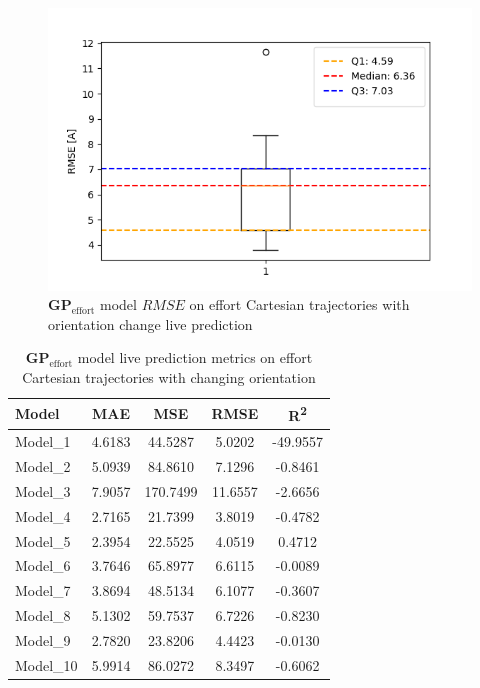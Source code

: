     \begin{figure}[H]
    \centering
    \includegraphics[width=1\columnwidth]{Images/05_results/effort_boxplot_live_OC_RMSE.png}
    \caption[\(\boldsymbol{GP}_{\text{effort}}\) model \(RMSE\) on effort Cartesian trajectories with orientation change live prediction]{\(\boldsymbol{GP}_{\text{effort}}\) model \(RMSE\) on effort Cartesian trajectories with orientation change live prediction}
    \label{fig:effort_oc_RMSE_live}
    \end{figure}

    \begin{table}[H]
    \centering
    \begin{tabular}{lcccc}
    \toprule
    \textbf{Model} & \textbf{MAE} & \textbf{MSE} & \textbf{RMSE} & \textbf{R\textsuperscript{2}} \\
    \midrule
    Model\_1 & 4.6183 & 44.5287 & 5.0202 & -49.9557 \\
    Model\_2 & 5.0939 & 84.8610 & 7.1296 & -0.8461 \\
    Model\_3 & 7.9057 & 170.7499 & 11.6557 & -2.6656 \\
    Model\_4 & 2.7165 & 21.7399 & 3.8019 & -0.4782 \\
    Model\_5 & 2.3954 & 22.5525 & 4.0519 & 0.4712 \\
    Model\_6 & 3.7646 & 65.8977 & 6.6115 & -0.0089 \\
    Model\_7 & 3.8694 & 48.5134 & 6.1077 & -0.3607 \\
    Model\_8 & 5.1302 & 59.7537 & 6.7226 & -0.8230 \\
    Model\_9 & 2.7820 & 23.8206 & 4.4423 & -0.0130 \\
    Model\_10 & 5.9914 & 86.0272 & 8.3497 & -0.6062 \\
    \bottomrule
    \end{tabular}
    \caption{\(\boldsymbol{GP}_{\text{effort}}\) model live prediction metrics on effort Cartesian trajectories with changing orientation}
    \end{table}


